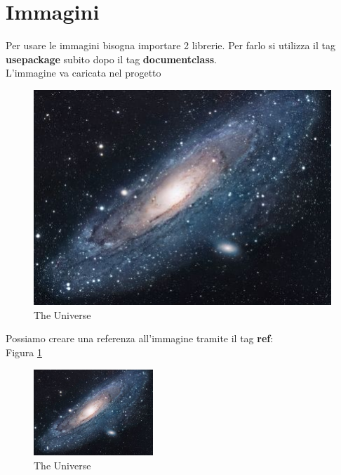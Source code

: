 \documentclass{article}
\begin{document}
\section{Immagini}
Per usare le immagini bisogna importare 2 librerie. Per farlo si utilizza il tag \textbf{usepackage} subito dopo il tag \textbf{documentclass}. \\ 
L'immagine va caricata nel progetto 


\begin{figure}[h!]
    \centering
    \includegraphics[scale=1.7]{img_src/universe.jpg}
    \caption{The Universe }
    \label{fig:my_label}
\end{figure}
\FloatBarrier



Possiamo creare una referenza all'immagine tramite il tag \textbf{ref}:\\
Figura \ref{fig:my_label}


\begin{figure}
    \centering
    \includegraphics[width=0.4\textwidth]{img_src/universe.jpg}
    \caption{The Universe }
    \label{fig:unilaterale}
\end{figure}
\FloatBarrier

\lipsum[2-4]

\listoffigures
\end{document}
